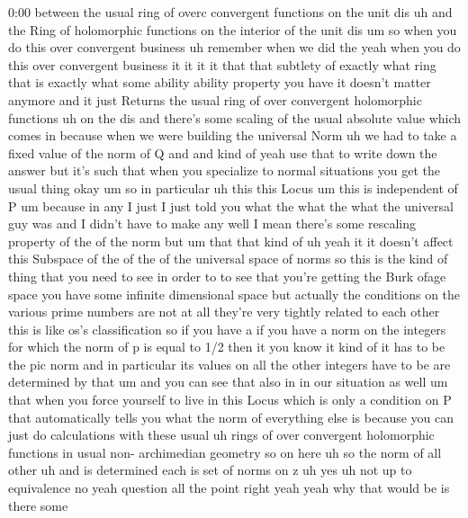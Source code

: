 \begin{unfinished}{0:00}
between  the  usual  ring  of  overc
convergent  functions  on  the  unit  dis  uh
and  the  Ring  of  holomorphic  functions  on
the  interior  of  the  unit
dis
um  so  when  you  do  this  over  convergent
business  uh  remember  when  we  did  the
yeah  when  you  do  this  over  convergent
business  it  it  it  it  that  that  subtlety
of  exactly  what  ring  that  is  exactly
what  some  ability  ability  property  you
have  it  doesn't  matter  anymore  and  it
just  Returns  the  usual  ring  of  over
convergent  holomorphic
functions  uh  on  the  dis  and  there's  some
scaling  of  the  usual  absolute  value
which  comes  in  because  when  we  were
building  the  universal  Norm  uh  we  had  to
take  a  fixed  value  of  the  norm  of  Q  and
and  kind
of
yeah  use  that  to  write  down  the  answer
but  it's  such  that  when  you  specialize
to  normal  situations  you  get  the  usual
thing
okay
um  so  in
particular  uh  this  this  Locus
um  this  is  independent  of
P  um
because  in  any  I  just  I  just  told  you
what  the  what  the  what  the  universal  guy
was  and  I  didn't  have  to  make  any  well  I
mean  there's
some  rescaling  property  of  the  of  the
norm  but  um  that  that  kind  of
uh  yeah  it  it  doesn't  affect  this
Subspace  of  the  of  the  of  the  universal
space  of
norms  so  this  is  the  kind  of  thing  that
you  need  to  see  in  order  to  to  see  that
you're  getting  the  Burk  ofage  space  you
have  some  infinite  dimensional  space  but
actually  the  conditions  on  the  various
prime  numbers  are  not  at  all  they're
very  tightly  related  to  each  other  this
is  like  os's  classification  so  if  you
have  a  if  you  have  a  norm  on  the
integers  for  which  the  norm  of  p  is
equal  to  1/2  then  it  you  know  it  kind  of
it  has  to  be  the  pic  norm  and  in
particular  its  values  on  all  the  other
integers  have  to  be  are  determined  by
that  um  and  you  can  see  that  also  in  in
our  situation  as  well  um  that  when  you
force  yourself  to  live  in  this  Locus
which  is  only  a  condition  on  P  that
automatically  tells  you  what  the  norm  of
everything  else  is  because  you  can  just
do  calculations  with  these  usual  uh
rings  of  over  convergent  holomorphic
functions  in  usual  non-  archimedian
geometry  so  on  here  uh  so  the  norm  of
all
other  uh  and  is
determined  each  is  set  of  norms  on  z  uh
yes  uh  not  up  to  equivalence
no  yeah
question  all  the
point  right  yeah
yeah  why  that  would  be  is  there  some

\end{unfinished}
